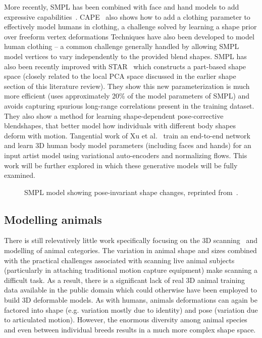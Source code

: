 More recently, SMPL has been combined with face and hand models to add expressive capabilities~\cite{xiang19monocular, joo18total, pavlakos19expressive}. CAPE~\cite{CAPE:CVPR:20} also shows how to add a clothing parameter to effectively model humans in clothing, a challenge solved by learning a shape prior over freeform vertex deformations Techniques have also been developed to model human clothing -- a common challenge generally handled by allowing SMPL model vertices to vary independently to the provided blend shapes. SMPL has also been recently improved with STAR~\cite{STAR:2020} which constructs a part-based shape space (closely related to the local PCA space discussed in the earlier shape section of this literature review). They show this new parameterization is much more efficient (uses approximately 20\% of the model parameters of SMPL) and avoids capturing spurious long-range correlations present in the training dataset. They also show a method for learning shape-dependent pose-corrective blendshapes, that better model how individuals with different body shapes deform with motion. Tangential work of Xu et al.~\cite{ghum-ghuml} train an end-to-end network and learn 3D human body model parameters (including faces and hands) for an input artist model using variational auto-encoders and normalizing flows. This work will be further explored  in which these generative models will be fully examined. 

\begin{figure}[t] %
    \caption{SMPL model showing pose-invariant shape changes, reprinted from~\cite{loper15smpl}.}
    \label{fig:smpl_model}
\end{figure}

\subsection{Modelling animals}

There is still relevatively little work specifically focusing on the 3D scanning~\cite{xxx} and modelling of animal categories. The variation in animal shape and sizes combined with the practical challenges associated with scanning live animal subjects (particularly in attaching traditional motion capture equipment) make scanning a difficult task. As a result, there is a significant lack of real 3D animal training data available in the public domain which could otherwise have been employed to build 3D deformable models. As with humans, animals deformations can again be factored into shape (e.g. variation mostly due to identity) and pose (variation due to articulated motion). However, the enormous diversity among animal species and even between individual breeds results in a much more complex shape space.

